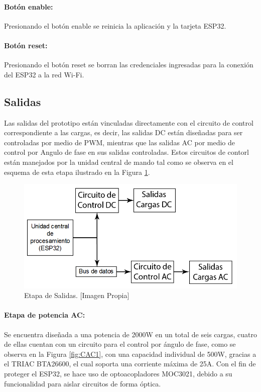 	\paragraph{Botón enable:}	Presionando el botón enable se reinicia la aplicación y la tarjeta ESP32.	
	\paragraph{Botón reset:}	Presionando el botón reset se borran las credenciales ingresadas para la conexión del ESP32 a la red Wi-Fi.\\
	\subsection{Salidas}
	
	Las salidas del prototipo están vinculadas directamente con el circuito de control correspondiente a las cargas, es decir, las salidas DC están diseñadas para ser controladas por medio de PWM, mientras que las salidas AC por medio de control por Angulo de fase en sus salidas controladas. Estos circuitos de contorl están manejados por la unidad central de mando tal como se observa en el esquema de esta etapa ilustrado en la Figura \ref{fig:BSalidas}.\\ 
	
	\begin{figure}[H]
		\centering
		\caption[Etapa de Salidas.]{Etapa de Salidas. [Imagen Propia]}
		\label{fig:BSalidas}
		\includegraphics[width=0.7\linewidth]{Imagenes/B_Salidas}
	\end{figure}	
	
	\paragraph{Etapa de potencia AC:}
		Se encuentra diseñada a una potencia de 2000W en un total de seis cargas, cuatro de ellas cuentan con un circuito para el control por ángulo de fase, como se observa en la Figura \ref{fig:CAC1}, con una capacidad individual de 500W, gracias a el TRIAC BTA26600, el cual soporta una corriente máxima de 25A. Con el fin de proteger el ESP32, se hace uso de optoacopladores MOC3021, debido a su funcionalidad para aislar circuitos de forma óptica.\\
		
